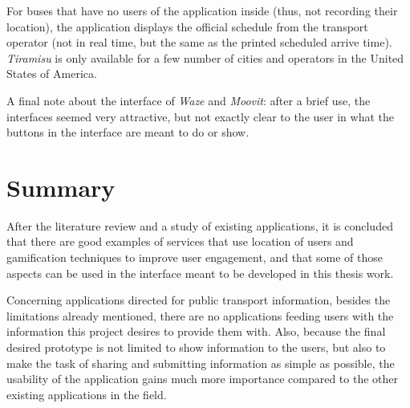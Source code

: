 For buses that have no users of the application inside (thus, not recording their location), the application displays the official schedule from the transport operator (not in real time, but the same as the printed scheduled arrive time). \emph{Tiramisu} is only available for a few number of cities and operators in the United States of America.


A final note about the interface of \emph{Waze} and \emph{Moovit}:  after a brief use, the interfaces seemed very attractive, but not exactly clear to the user in what the buttons in the interface are meant to do or show.

\section{Summary}

After the literature review and a study of existing applications, it is concluded that there are good examples of services that use location of users and gamification techniques to improve user engagement, and that some of those aspects can be used in the interface meant to be developed in this thesis work. 

Concerning applications directed for public transport information, besides the limitations already mentioned, there are no applications feeding users with the information this project desires to provide them with. Also, because the final desired prototype is not limited to show information to the users, but also to make the task of sharing and submitting information as simple as possible, the usability of the application gains much more importance compared to the other existing applications in the field.